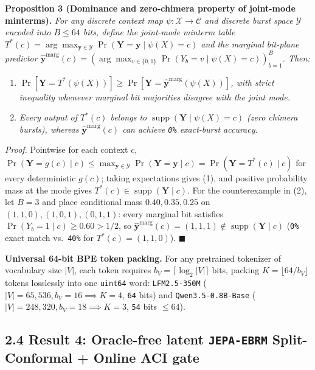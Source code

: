 \documentclass[10pt]{article}
\begin{document}
\textbf{Proposition 3 (Dominance and zero-chimera property of joint-mode minterms).} \emph{For any discrete context map $\psi: \mathcal{X} \to \mathcal{C}$ and discrete burst space $\mathcal{Y}$ encoded into $B \le 64$ bits, define the joint-mode minterm table $T^*(c) = \arg\max_{\mathbf{y} \in \mathcal{Y}} \Pr(\mathbf{Y} = \mathbf{y} \mid \psi(X) = c)$ and the marginal bit-plane predictor $\hat{\mathbf{y}}^{\text{marg}}(c) = (\arg\max_{v \in \{0,1\}} \Pr(Y_b = v \mid \psi(X)=c))_{b=1}^B$. Then:}
\begin{enumerate}
  \item \emph{$\Pr[\mathbf{Y} = T^*(\psi(X))] \ge \Pr[\mathbf{Y} = \hat{\mathbf{y}}^{\text{marg}}(\psi(X))]$, with strict inequality whenever marginal bit majorities disagree with the joint mode.}
  \item \emph{Every output of $T^*(c)$ belongs to $\operatorname{supp}(\mathbf{Y} \mid \psi(X)=c)$ (zero chimera bursts), whereas $\hat{\mathbf{y}}^{\text{marg}}(c)$ can achieve \texttt{0\%} exact-burst accuracy.}
\end{enumerate}
\emph{Proof.} Pointwise for each context $c$, $\Pr(\mathbf{Y} = g(c) \mid c) \le \max_{\mathbf{y} \in \mathcal{Y}} \Pr(\mathbf{Y} = \mathbf{y} \mid c) = \Pr(\mathbf{Y} = T^*(c) \mid c)$ for every deterministic $g(c)$; taking expectations gives (1), and positive probability mass at the mode gives $T^*(c) \in \operatorname{supp}(\mathbf{Y}\mid c)$. For the counterexample in (2), let $B=3$ and place conditional mass $0.40, 0.35, 0.25$ on $(1,1,0), (1,0,1), (0,1,1)$: every marginal bit satisfies $\Pr(Y_b=1\mid c) \ge 0.60 > 1/2$, so $\hat{\mathbf{y}}^{\text{marg}}(c) = (1,1,1) \notin \operatorname{supp}(\mathbf{Y}\mid c)$ (\texttt{0\%} exact match vs.\ \texttt{40\%} for $T^*(c)=(1,1,0)$). $\blacksquare$

\textbf{Universal 64-bit BPE token packing.} For any pretrained tokenizer of vocabulary size $|V|$, each token requires $b_V = \lceil \log_2 |V| \rceil$ bits, packing $K = \lfloor 64 / b_V \rfloor$ tokens losslessly into one \texttt{uint64} word: \texttt{LFM2.5-350M} ($|V|=65{,}536, b_V=16 \implies K=4$, \texttt{64} bits) and \texttt{Qwen3.5-0.8B-Base} ($|V|=248{,}320, b_V=18 \implies K=3$, \texttt{54} bits $\le 64$).

\subsection{2.4 Result 4: Oracle-free latent \texttt{JEPA-EBRM} Split-Conformal + Online ACI gate}\label{result-4}
\end{document}
